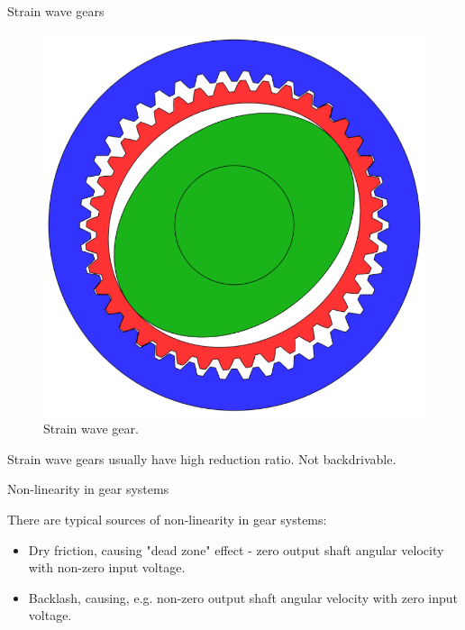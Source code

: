 \documentclass{beamer}
\begin{document}
\begin{frame}{Strain wave gears}
	\begin{flushleft}
		
		\begin{figure}
			\centering
			\includegraphics[width=0.5\linewidth]{strain_wave}
			\caption{Strain wave gear. }
			\label{fig:worm}
		\end{figure}
		
		Strain wave gears usually have high reduction ratio. Not backdrivable.
		
		
	\end{flushleft}
\end{frame}



\begin{frame}{Non-linearity in gear systems}
	\begin{flushleft}
		
		There are typical sources of non-linearity in gear systems: 
		
		\begin{itemize}
			\item Dry friction, causing "dead zone" effect - zero output shaft angular velocity with non-zero input voltage.
			
			\item Backlash, causing, e.g. non-zero output shaft angular velocity with zero input voltage.
		\end{itemize}  
		
		
	\end{flushleft}
\end{frame}
\end{document}
